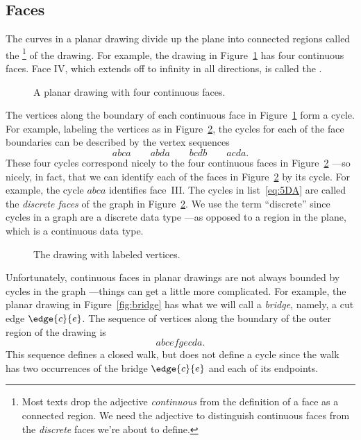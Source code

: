 \subsection{Faces}

The curves in a planar drawing divide up the plane into connected
regions called the \footnote{Most texts drop
  the adjective \emph{continuous} from the definition of a face as a
  connected region.  We need the adjective to distinguish continuous
  faces from the \emph{discrete} faces we're about to define.} of the
drawing.  For example, the drawing in
Figure~\ref{fig:continuous-faces} has four continuous faces.  Face IV,
which extends off to infinity in all directions, is called the
.

\begin{figure}


\caption{A planar drawing with four continuous faces.}
\label{fig:continuous-faces}
\end{figure}

The vertices along the boundary of each continuous face in
Figure~\ref{fig:continuous-faces} form a cycle.  For example, labeling the
vertices as in Figure~\ref{fig:continuous-cycles}, the cycles for each of the face
boundaries can be described by the vertex sequences
\begin{equation}\label{eq:5DA}
abca \qquad abda \qquad bcdb \qquad acda.
\end{equation}
These four cycles correspond nicely to the four continuous faces in
Figure~\ref{fig:continuous-cycles} ---so nicely, in fact, that we can
identify each of the faces in Figure~\ref{fig:continuous-cycles} by
its cycle.  For example, the cycle $abca$ identifies
face~III\@.  The cycles in list~\ref{eq:5DA} are called the
\emph{discrete faces} of the graph in
Figure~\ref{fig:continuous-cycles}.  We use the term ``discrete''
since cycles in a graph are a discrete data type ---as opposed to a
region in the plane, which is a continuous data type.

\begin{figure}


\caption{The drawing with labeled vertices.}
\label{fig:continuous-cycles}
\end{figure}

Unfortunately, continuous faces in planar drawings are not always
bounded by cycles in the graph ---things can get a little more
complicated.  For example, the planar drawing in
Figure~\ref{fig:bridge} has what we will call a \emph{bridge}, namely,
a cut edge $\edge{c}{e}$.  The sequence of vertices along the boundary
of the outer region of the drawing is
\[
abcefgecda.
\]
This sequence defines a closed walk, but does not define a cycle since
the walk has two occurrences of the bridge $\edge{c}{e}$ and each of
its endpoints.

